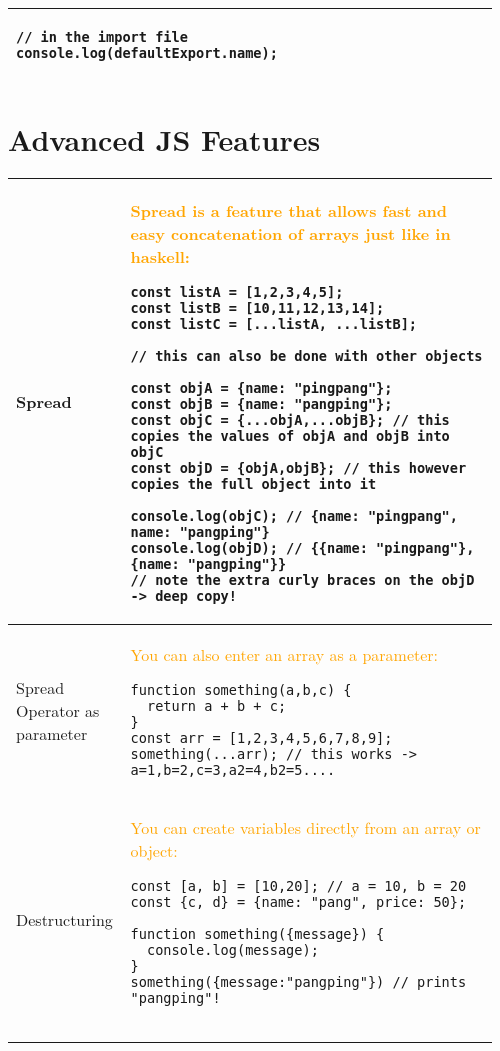 \documentclass[main.tex,fontsize=8pt,paper=a4,paper=portrait,DIV=calc,]{scrartcl}
\begin{document}
\begin{table}[ht!]
\begin{tabular}{|m{0.2\linewidth}|m{0.755\linewidth}|}
\begin{lstlisting}
// in the import file
console.log(defaultExport.name);
\end{lstlisting}
\\
\hline
\end{tabular}
\section{Advanced JS Features}
\begin{tabular}{|m{0.2\linewidth}|m{0.755\linewidth}|}
\hline
Spread & 
\textcolor{orange}{Spread is a feature that allows fast and easy concatenation of arrays just like in haskell:}\newline
\begin{lstlisting}
const listA = [1,2,3,4,5];
const listB = [10,11,12,13,14];
const listC = [...listA, ...listB];

// this can also be done with other objects

const objA = {name: "pingpang"};
const objB = {name: "pangping"};
const objC = {...objA,...objB}; // this copies the values of objA and objB into objC
const objD = {objA,objB}; // this however copies the full object into it

console.log(objC); // {name: "pingpang", name: "pangping"}
console.log(objD); // {{name: "pingpang"}, {name: "pangping"}}
// note the extra curly braces on the objD -> deep copy!
\end{lstlisting}\\
\hline
Spread Operator as parameter & 
\textcolor{orange}{You can also enter an array as a parameter:}\newline
\begin{lstlisting}
function something(a,b,c) {
  return a + b + c;
}
const arr = [1,2,3,4,5,6,7,8,9];
something(...arr); // this works -> a=1,b=2,c=3,a2=4,b2=5....
\end{lstlisting}\\
\hline
Destructuring & 
\textcolor{orange}{You can create variables directly from an array or object:}\newline
\begin{lstlisting}
const [a, b] = [10,20]; // a = 10, b = 20 
const {c, d} = {name: "pang", price: 50};

function something({message}) {
  console.log(message);
}
something({message:"pangping"}) // prints "pangping"!


\end{lstlisting}
\end{tabular}
\end{table}
\end{document}
